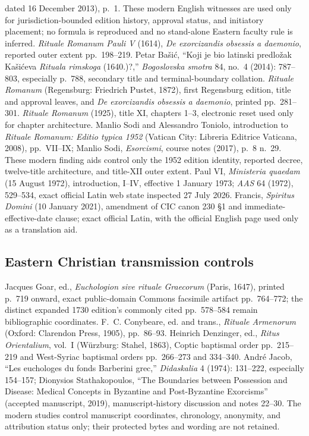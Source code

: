 dated 16 December 2013), p.~1. These modern English witnesses are used only
for jurisdiction-bounded edition history, approval status, and initiatory
placement; no formula is reproduced and no stand-alone Eastern faculty rule
is inferred.
\emph{Rituale Romanum Pauli V} (1614), \emph{De exorcizandis obsessis a
daemonio}, reported outer extent pp.~198--219. Petar Bašić, ``Koji je bio
latinski predložak Kašićeva \emph{Rituala rimskoga} (1640.)?,''
\emph{Bogoslovska smotra} 84, no.~4 (2014): 787--803, especially p.~788,
secondary title and terminal-boundary collation. \emph{Rituale Romanum} (Regensburg:
Friedrich Pustet, 1872), first Regensburg edition, title and approval leaves,
and \emph{De exorcizandis obsessis a daemonio}, printed pp.~281--301.
\emph{Rituale Romanum} (1925), title XI, chapters 1--3, electronic reset used
only for chapter architecture. Manlio Sodi and Alessandro Toniolo,
introduction to \emph{Rituale Romanum: Editio typica 1952} (Vatican City:
Libreria Editrice Vaticana, 2008), pp.~VII--IX; Manlio Sodi,
\emph{Esorcismi}, course notes (2017), p.~8 n.~29. These modern finding aids
control only the 1952 edition identity, reported decree, twelve-title
architecture, and title-XII outer extent.
Paul VI, \emph{Ministeria quaedam} (15 August 1972), introduction, I--IV,
effective 1 January 1973; \emph{AAS} 64 (1972), 529--534, exact official
Latin web state inspected 27 July 2026.
Francis, \emph{Spiritus Domini} (10 January 2021), amendment of CIC
canon 230 \S1 and immediate-effective-date clause; exact official Latin, with
the official English page used only as a translation aid.

\subsection{Eastern Christian transmission controls}

Jacques Goar, ed., \emph{Euchologion sive rituale Graecorum} (Paris, 1647),
printed p.~719 onward, exact public-domain Commons facsimile artifact
pp.~764--772; the distinct expanded 1730 edition's commonly cited
pp.~578--584 remain bibliographic coordinates. F.~C. Conybeare, ed. and
trans., \emph{Rituale Armenorum} (Oxford: Clarendon Press, 1905),
pp.~86--93. Heinrich Denzinger, ed., \emph{Ritus Orientalium}, vol.~I
(Würzburg: Stahel, 1863), Coptic baptismal order pp.~215--219 and
West-Syriac baptismal orders pp.~266--273 and 334--340.
André Jacob, ``Les euchologes du fonds Barberini grec,'' \emph{Didaskalia}
4 (1974): 131--222, especially 154--157; Dionysios Stathakopoulos,
``The Boundaries between Possession and Disease: Medical Concepts in
Byzantine and Post-Byzantine Exorcisms'' (accepted manuscript, 2019),
manuscript-history discussion and notes 22--30. The modern studies control
manuscript coordinates, chronology, anonymity, and attribution status only;
their protected bytes and wording are not retained.

